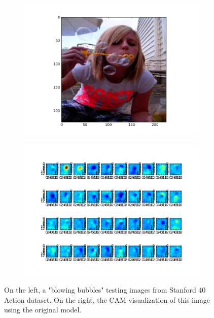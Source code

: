\documentclass[12pt, letterpaper, twoside]{article}
\begin{document}
		\begin{figure}[h]
			\begin{subfigure}[c]{0.3\textwidth}
				\includegraphics[width=\textwidth]{test_image}
			\end{subfigure}
			\begin{subfigure}[c]{0.69\textwidth}
				\includegraphics[width=\textwidth]{GAP_orig_viz}
			\end{subfigure}
			\centering
			\caption{On the left, a "blowing bubbles" testing images from Stanford 40 Action dataset. On the right, the CAM visualization of this image using the original model.}
			\label{fig:CAM_with_GAP_original}
		\end{figure}
\end{document}
